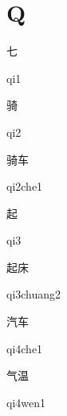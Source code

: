 ﻿%
\section*{Q}
\begin{multicols*}{2}

\begin{verbete}[qi1]{七}
\begin{pronuncia}{qi1}
\end{pronuncia}
\end{verbete}

\begin{verbete}[qi2]{骑}
\begin{pronuncia}{qi2}
\end{pronuncia}
\end{verbete}

\begin{verbete}[qi2che1]{骑车}
\begin{pronuncia}{qi2che1}
\end{pronuncia}
\end{verbete}

\begin{verbete}[qi3]{起}
\begin{pronuncia}{qi3}
\end{pronuncia}
\end{verbete}

\begin{verbete}[qi3chuang2]{起床}
\begin{pronuncia}{qi3chuang2}
\end{pronuncia}
\end{verbete}

\begin{verbete}[qi4che1]{汽车}
\begin{pronuncia}{qi4che1}
\end{pronuncia}
\end{verbete}

\begin{verbete}[qi4wen1]{气温}
\begin{pronuncia}{qi4wen1}
\end{pronuncia}
\end{verbete}


\end{multicols*}
